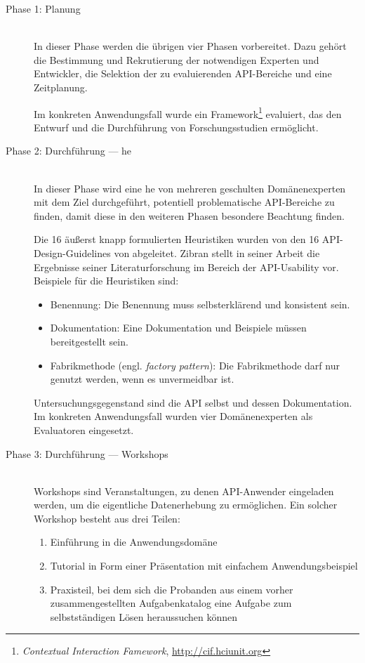 \begin{description}
  \item[Phase 1: Planung] \hfill \\
  In dieser Phase werden die übrigen vier Phasen vorbereitet. Dazu gehört die Bestimmung und Rekrutierung der notwendigen Experten und Entwickler, die Selektion der zu evaluierenden API-Bereiche und eine Zeitplanung.
  
  Im konkreten Anwendungsfall wurde ein Framework\footnote{\textit{Contextual Interaction Famework}, \url{http://cif.hciunit.org}} evaluiert, das den Entwurf und die Durchführung von Forschungsstudien ermöglicht.
   
  \item[Phase 2: Durchführung --- \gls{he}] \hfill \\
  In dieser Phase wird eine \gls{he} von mehreren geschulten Domänenexperten mit dem Ziel durchgeführt, potentiell problematische API-Bereiche zu finden, damit diese in den weiteren Phasen besondere Beachtung finden.
  
  Die 16 äußerst knapp formulierten Heuristiken wurden von den 16 API-Design-Guidelines von \cite{zibran2008makes} abgeleitet. Zibran stellt in seiner Arbeit die Ergebnisse seiner Literaturforschung im Bereich der API-Usability vor. Beispiele für die Heuristiken sind:
  \begin{itemize}
    \item Benennung: Die Benennung muss selbsterklärend und konsistent sein.
    \item Dokumentation: Eine Dokumentation und Beispiele müssen bereitgestellt sein.
    \item Fabrikmethode (engl. \textit{factory pattern}): Die Fabrikmethode darf nur genutzt werden, wenn es unvermeidbar ist.
  \end{itemize}
  
  Untersuchungsgegenstand sind die API selbst und dessen Dokumentation. Im konkreten Anwendungsfall wurden vier Domänenexperten als Evaluatoren eingesetzt.
   
  \item[Phase 3: Durchführung --- Workshops] \hfill \\
  Workshops sind Veranstaltungen, zu denen API-Anwender eingeladen werden, um die eigentliche Datenerhebung zu ermöglichen. Ein solcher Workshop besteht aus drei Teilen:
  \begin{enumerate}
    \item Einführung in die Anwendungsdomäne
    \item Tutorial in Form einer Präsentation mit einfachem Anwendungsbeispiel
    \item Praxisteil, bei dem sich die Probanden aus einem vorher zusammengestellten Aufgabenkatalog eine Aufgabe zum selbstständigen Lösen heraussuchen können 
  \end{enumerate}
  

\end{description}
